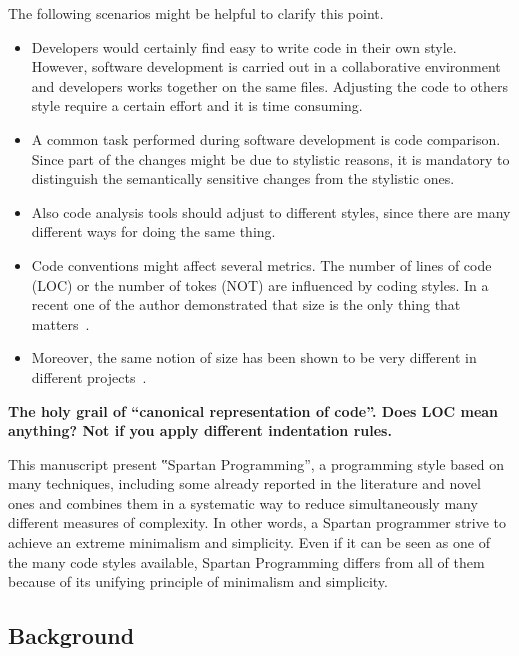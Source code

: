 The following scenarios might be helpful to clarify this point.
\begin{itemize}
    \item Developers would certainly find easy to write code in their own style. However, software
    development is carried out in a collaborative environment and developers works together on
    the same files. Adjusting the code to others style require a certain effort and it is time consuming.
    \item A common task performed during software development is code comparison.
    Since part of the changes might be due to stylistic reasons, it is mandatory to distinguish the
    semantically sensitive changes from the stylistic ones.
    \item Also code analysis tools should adjust to different styles, since there are many
        different ways for doing the same thing.
    \item Code conventions might affect several metrics. The number of lines of code (LOC) or the number of
    tokes (NOT) are influenced by coding styles. In a recent one of the author demonstrated that size
      is the only thing that matters~\cite{Gil:Lalouche:16}.
    \item Moreover, the same notion of size has been shown to be very different in different projects~\cite{Gil:Lalouche:16}.
\end{itemize}

\textbf{The holy grail of ``canonical representation of code''.  
  Does LOC mean anything?  Not if you apply different indentation 
rules.}

This manuscript present ‟Spartan Programming”, a programming style based on
many techniques, including some already reported in the literature and novel
ones and combines them in a systematic way to reduce simultaneously many
different measures of complexity. In other words, a Spartan programmer strive
to achieve an extreme minimalism and simplicity. Even if it can be seen as one
of the many code styles available, Spartan Programming differs from all of them
because of its unifying principle of minimalism and simplicity.

\subsection{Background}

